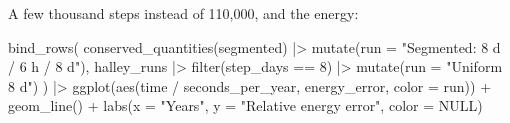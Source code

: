 \documentclass[
  10.5pt,
  letterpaper,
]{scrbook}
\newenvironment{Shaded}{\begin{snugshade}}{\end{snugshade}}
\newcommand{\AttributeTok}[1]{\textcolor[rgb]{0.00,0.00,0.00}{#1}}
\newcommand{\CommentTok}[1]{\textcolor[rgb]{0.00,0.00,0.00}{\textit{#1}}}
\newcommand{\ConstantTok}[1]{\textcolor[rgb]{0.00,0.00,0.00}{#1}}
\newcommand{\DecValTok}[1]{\textcolor[rgb]{0.00,0.00,0.00}{#1}}
\newcommand{\FunctionTok}[1]{\textcolor[rgb]{0.00,0.00,0.00}{#1}}
\newcommand{\NormalTok}[1]{\textcolor[rgb]{0.00,0.00,0.00}{#1}}
\newcommand{\OtherTok}[1]{\textcolor[rgb]{0.00,0.00,0.00}{#1}}
\newcommand{\SpecialCharTok}[1]{\textcolor[rgb]{0.00,0.00,0.00}{#1}}
\newcommand{\StringTok}[1]{\textcolor[rgb]{0.00,0.00,0.00}{#1}}
\theoremstyle{plain}
\theoremstyle{remark}
\begin{document}
\begin{Shaded}
\end{Shaded}

A few thousand steps instead of 110,000, and the energy:

\begin{Shaded}
\begin{Highlighting}[]
\FunctionTok{bind\_rows}\NormalTok{(}
  \FunctionTok{conserved\_quantities}\NormalTok{(segmented) }\SpecialCharTok{|\textgreater{}} \FunctionTok{mutate}\NormalTok{(}\AttributeTok{run =} \StringTok{"Segmented: 8 d / 6 h / 8 d"}\NormalTok{),}
\NormalTok{  halley\_runs }\SpecialCharTok{|\textgreater{}} \FunctionTok{filter}\NormalTok{(step\_days }\SpecialCharTok{==} \DecValTok{8}\NormalTok{) }\SpecialCharTok{|\textgreater{}} \FunctionTok{mutate}\NormalTok{(}\AttributeTok{run =} \StringTok{"Uniform 8 d"}\NormalTok{)}
\NormalTok{) }\SpecialCharTok{|\textgreater{}}
  \FunctionTok{ggplot}\NormalTok{(}\FunctionTok{aes}\NormalTok{(time }\SpecialCharTok{/}\NormalTok{ seconds\_per\_year, energy\_error, }\AttributeTok{color =}\NormalTok{ run)) }\SpecialCharTok{+}
  \FunctionTok{geom\_line}\NormalTok{() }\SpecialCharTok{+}
  \FunctionTok{labs}\NormalTok{(}\AttributeTok{x =} \StringTok{"Years"}\NormalTok{, }\AttributeTok{y =} \StringTok{"Relative energy error"}\NormalTok{, }\AttributeTok{color =} \ConstantTok{NULL}\NormalTok{)}
\end{Highlighting}
\end{Shaded}
\end{document}
